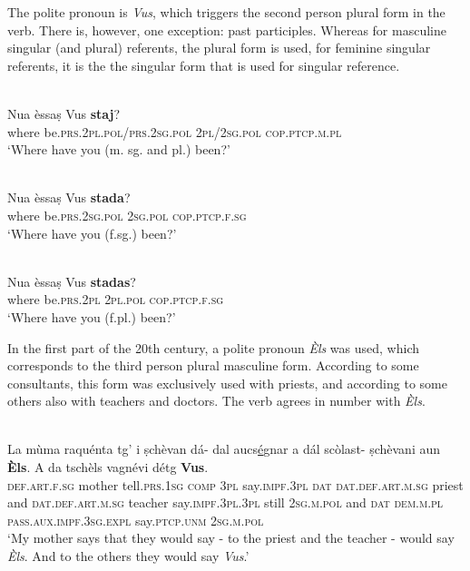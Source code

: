 The polite pronoun is \textit{Vus}, which triggers the second person plural form in the verb. There is, however, one exception: past participles. Whereas for masculine singular (and plural) referents, the plural form is used, for feminine singular referents, it is the the singular form that is used for singular reference.

\ea
\label{}
\\
\gll  Nua èssaṣ Vus \textbf{staj}?\\
 where be.\textsc{prs.2pl.pol/prs.2sg.pol} \textsc{2pl/2sg.pol} \textsc{cop.ptcp.m.pl}\\
\glt `Where have you (m. sg. and pl.) been?'
\z

\ea
\label{}
\\
\gll Nua èssaṣ Vus \textbf{stada}?\\
where be.\textsc{prs.2sg.pol} \textsc{2sg.pol} \textsc{cop.ptcp.f.sg}\\
\glt `Where have you (f.sg.) been?'
\z

\ea
\label{}
\\
\gll Nua èssaṣ Vus \textbf{stadas}?\\
where be.\textsc{prs.2pl} \textsc{2pl.pol} \textsc{cop.ptcp.f.sg}\\
\glt `Where have you (f.pl.) been?'
\z

In the first part of the 20th century, a polite pronoun \textit{Èls} was used, which corresponds to the third person plural masculine form. According to some consultants, this form was exclusively used with priests, and according to some others also with teachers and doctors. The verb agrees in number with \textit{Èls}.

\ea
\label{}
\\
\gll La mùma raquénta tg' i ṣchèvan dá- dal aucs\underline{é}gnar a dál scòlast- ṣchèvani aun \textbf{Èls}. A da tschèls vagnévi détg \textbf{Vus}.\\
\textsc{def.art.f.sg} mother tell.\textsc{prs.1sg} \textsc{comp} \textsc{3pl} say.\textsc{impf.3pl} \textsc{dat} \textsc{dat.def.art.m.sg} priest and \textsc{dat.def.art.m.sg} teacher say.\textsc{impf.3pl.3pl} still \textsc{2sg.m.pol} and \textsc{dat} \textsc{dem.m.pl} \textsc{pass.aux.impf.3sg.expl} say.\textsc{ptcp.unm} \textsc{2sg.m.pol}\\
\glt `My mother says that they would say - to the priest and the teacher - would say \textit{Èls}. And to the others they would say \textit{Vus}.'
\z

